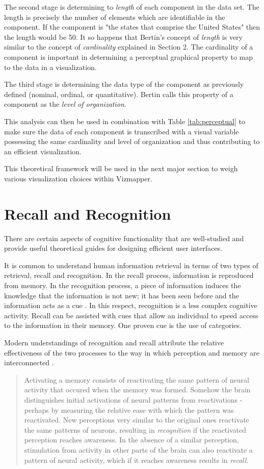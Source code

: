 The second stage is determining to \emph{length} of each component in the data set. The length is precisely the number of elements which are identifiable in the component. If the component is "the states that comprise the United States" then the length would be 50. It so happens that Bertin's concept of \emph{length} is very similar to the concept of \emph{cardinality} explained in Section 2. The cardinality of a component is important in determining a perceptual graphical property to map to the data in a visualization.

The third stage is determining the data type of the component as previously defined (nominal, ordinal, or quantitative). Bertin calls this property of a component as the \emph{level of organization}.

This analysis can then be used in combination with Table \ref{tab:perceptual} to make sure the data of each component is transcribed with a visual variable possessing the same cardinality and level of organization and thus contributing to an efficient visualization.

This theoretical framework will be used in the next major section to weigh various visualization choices within Vizmapper.

\section{Recall and Recognition}

There are certain aspects of cognitive functionality that are well-studied and provide useful theoretical guides for designing efficient user interfaces.

It is common to understand human information retrieval in terms of two types of retrieval, recall and recognition. In the recall process, information is reproduced from memory. In the recognition process, a piece of information induces the knowledge that the information is not new; it has been seen before and the information acts as a cue \cite{hci1998}. In this respect, recognition is a less complex cognitive activity. Recall can be assisted with cues that allow an individual to speed access to the information in their memory. One proven cue is the use of categories.

Modern understandings of recognition and recall attribute the relative effectiveness of the two processes to the way in which perception and memory are interconnected \cite{mindinmind2010}.

\begin{quote}
Activating a memory consists of reactivating the same pattern of neural activity that occured when the memory was formed. Somehow the brain distinguishes initial activations of neural patterns from reactivations - perhaps by measuring the relative ease with which the pattern was reactivated. New perceptions very similar to the original ones reactivate the same patterns of neurons, resulting in \emph{recognition} if the reactivated perception reaches awareness. In the absence of a similar perception, stimulation from activity in other parts of the brain can also reactivate a pattern of neural activity, which if it reaches awareness results in \emph{recall}. \cite{mindinmind2010}
\end{quote}

